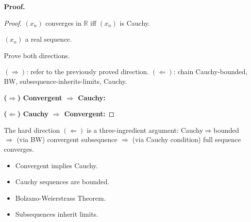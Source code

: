 \noindent
\textbf{Proof.}
\begin{proof}
\Claim $(x_n)$ converges in $\mathbb{R}$ iff $(x_n)$ is Cauchy.

\Given $(x_n)$ a real sequence.

\Goal Prove both directions.

\Strategy $(\Rightarrow)$: refer to the previously proved direction.
$(\Leftarrow)$: chain Cauchy-bounded, BW, subsequence-inherits-limits, Cauchy.

\medskip

\textbf{($\Rightarrow$) Convergent $\Rightarrow$ Cauchy:}

\medskip

\textbf{($\Leftarrow$) Cauchy $\Rightarrow$ Convergent:}




\end{proof}

\begin{remark*}
The hard direction $(\Leftarrow)$ is a three-ingredient argument:
Cauchy$\Rightarrow$bounded $\Rightarrow$ (via BW) convergent subsequence
$\Rightarrow$ (via Cauchy condition) full sequence converges.
\end{remark*}

\begin{remark*}[Dependencies]
\begin{itemize}
  \item Convergent implies Cauchy.
  \item Cauchy sequences are bounded.
  \item Bolzano-Weierstrass Theorem.
  \item Subsequences inherit limits.
\end{itemize}
\end{remark*}
